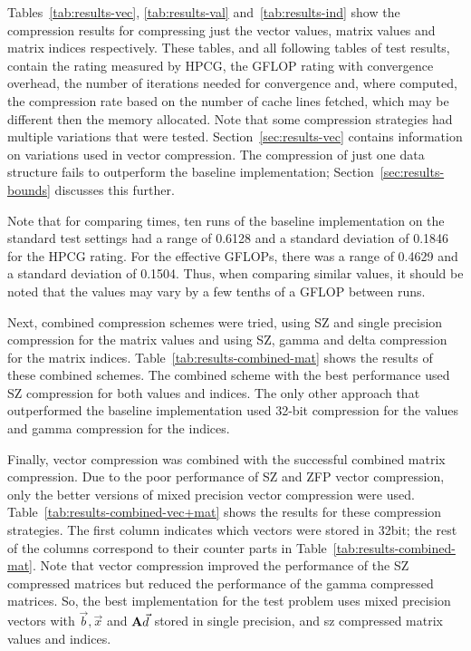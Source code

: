 Tables~\ref{tab:results-vec}, \ref{tab:results-val} and~\ref{tab:results-ind} show the compression results for compressing just the vector values, matrix values and matrix indices respectively.
These tables, and all following tables of test results, contain the rating measured by HPCG, the GFLOP rating with convergence overhead, the number of iterations needed for convergence and, where computed, the compression rate based on the number of cache lines fetched, which may be different then the memory allocated.
Note that some compression strategies had multiple variations that were tested.
Section~\ref{sec:results-vec} contains information on variations used in vector compression.
The compression of just one data structure fails to outperform the baseline implementation; Section~\ref{sec:results-bounds} discusses this further.






Note that for comparing times, ten runs of the baseline implementation on the standard test settings had a range of 0.6128 and a standard deviation of 0.1846 for the HPCG rating.
For the effective GFLOPs, there was a range of 0.4629 and a standard deviation of 0.1504.
Thus, when comparing similar values, it should be noted that the values may vary by a few tenths of a GFLOP between runs.

Next, combined compression schemes were tried, using SZ and single precision compression for the matrix values and using SZ, gamma and delta compression for the matrix indices.
Table~\ref{tab:results-combined-mat} shows the results of these combined schemes.
The combined scheme with the best performance used SZ compression for both values and indices.
The only other approach that outperformed the baseline implementation used 32-bit compression for the values and gamma compression for the indices.



Finally, vector compression was combined with the successful combined matrix compression.
Due to the poor performance of SZ and ZFP vector compression, only the better versions of mixed precision vector compression were used.
Table~\ref{tab:results-combined-vec+mat} shows the results for these compression strategies.
The first column indicates which vectors were stored in 32bit; the rest of the columns correspond to their counter parts in Table~\ref{tab:results-combined-mat}.
Note that vector compression improved the performance of the SZ compressed matrices but reduced the performance of the gamma compressed matrices.
So, the best implementation for the test problem uses mixed precision vectors with \(\vec{b}, \vec{x}\) and \(\mathbf{A}\vec{d}\) stored in single precision, and sz compressed matrix values and indices.

